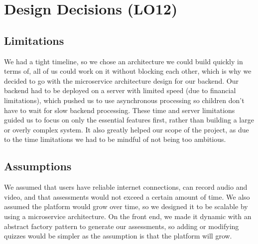 \documentclass{article}
\begin{document}


\newpage

\section{Design Decisions (LO12)}

\subsection{Limitations}
We had a tight timeline, so we chose an architecture we could build quickly in terms of, all of us could work 
on it without blocking each other, which is why we decided to go with the microservice architecture design for our backend.
Our backend had to be deployed on a server with limited speed (due to financial limitations), which pushed us to use asynchronous processing 
so children don't have to wait for slow backend processing. These time and server limitations guided us to focus on only 
the essential features first, rather than building a large or overly complex system. It also greatly helped our scope of the project, as due to the time limitations
we had to be mindful of not being too ambitious.

\subsection{Assumptions}
We assumed that users have reliable internet connections, can record audio and video, and that assessments would 
not exceed a certain amount of time. We also assumed the platform would grow over time, so we designed it to be 
scalable by using a microservice architecture. On the front end, we made it dynamic with an abstract 
factory pattern to generate our assessments, so adding or modifying quizzes would be simpler as the assumption is that the platform will grow. 
\end{document}
